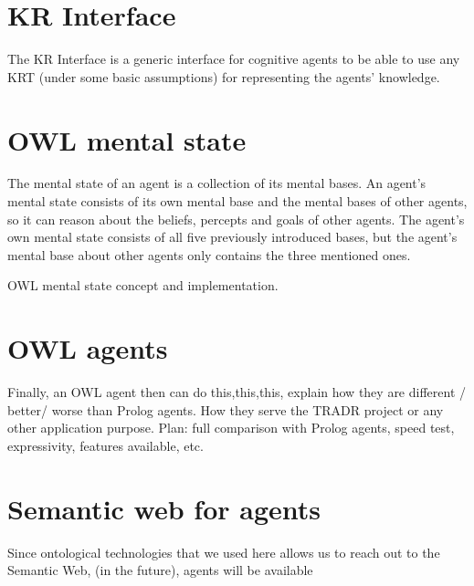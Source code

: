 \section{KR Interface}

The KR Interface is a generic interface for cognitive agents to be able to use any KRT (under some basic assumptions) for representing the agents' knowledge. 


\section{OWL mental state}

The mental state of an agent is a collection of its mental bases. An agent's mental state consists of its own mental base and the mental bases of other agents, so it can reason about the beliefs, percepts and goals of other agents. The agent's own mental state consists of all five previously introduced bases, but the agent's mental base about other agents only contains the three mentioned ones. 

OWL mental state concept and implementation.

\section{OWL agents}

Finally, an OWL agent then can do this,this,this, explain how they are different / better/ worse than Prolog agents. How they serve the TRADR project or any other application purpose. 
Plan: full comparison with Prolog agents, speed test, expressivity, features available, etc.

\section{Semantic web for agents}

Since ontological technologies that we used here allows us to reach out to the Semantic Web,
(in the future), agents will be available 


  
  
  
  
  
  
  
  
  